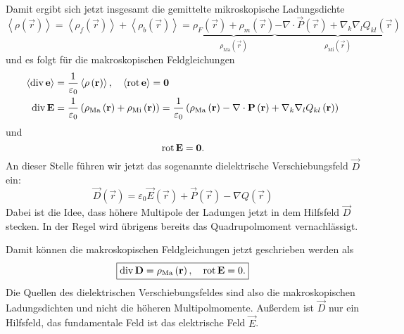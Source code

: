 Damit ergibt sich jetzt insgesamt die gemittelte mikroskopische Ladungsdichte
\begin{equation*}
	\left\langle \rho \left(\vec {r}\right)\right\rangle =\left\langle \rho _{f}\left(\vec {r}\right)\right\rangle +\left\langle \rho _{b}\left(\vec {r}\right)\right\rangle =\underset{\rho _{\mathrm{Ma}}\left(\vec {r}\right)}{\underbrace{\rho _{F}\left(\vec {r}\right)+\rho _{m}\left(\vec {r}\right)}}\underset{\rho _{\mathrm{Mi}}\left(\vec {r}\right)}{\underbrace{-\nabla \cdot \vec {P}\left(\vec {r}\right)+\nabla _{k}\nabla _{l}Q_{kl}\left(\vec {r}\right)}}
\end{equation*}
und es folgt für die makroskopischen Feldgleichungen
\begin{align*}
	\left\langle \operatorname{div} \mathbf{e}\right\rangle & =\frac{1}{\varepsilon _{0}}\left\langle \rho \left(\mathbf{r}\right)\right\rangle ,\quad \left\langle \operatorname{rot} \mathbf{e}\right\rangle =\mathbf{0}    \\
	\operatorname{div} \mathbf{E}                           & =\frac{1}{\varepsilon _{0}}\left(\rho _{\mathrm{Ma}}\left(\mathbf{r}\right)+\rho _{\mathrm{Mi}}\left(\mathbf{r}\right)\right)=\frac{1}{\varepsilon _{0}}\left(\rho _{\mathrm{Ma}}\left(\mathbf{r}\right)-\nabla \cdot \mathbf{P}\left(\mathbf{r}\right)+\nabla _{k}\nabla _{l}Q_{kl}\left(\mathbf{r}\right)\right)
\end{align*}
und
\begin{equation*}
	\operatorname{rot} \mathbf{E}=\mathbf{0}.
\end{equation*}
An dieser Stelle führen wir jetzt das sogenannte dielektrische Verschiebungsfeld $\vec {D}$ ein:
\begin{equation*}
	\vec {D}\left(\vec {r}\right)=\varepsilon _{0}\vec {E}\left(\vec {r}\right)+\vec {P}\left(\vec {r}\right)-\nabla Q\left(\vec {r}\right)
\end{equation*}
Dabei ist die Idee, dass höhere Multipole der Ladungen jetzt in dem Hilfsfeld $\vec {D}$ stecken. In der Regel wird übrigens bereits das Quadrupolmoment vernachlässigt.

Damit können die makroskopischen Feldgleichungen jetzt geschrieben werden als
\begin{equation*}
	\boxed{\operatorname{div} \mathbf{D}=\rho _{\mathrm{Ma}}\left(\mathbf{r}\right), \quad\operatorname{rot} \mathbf{E}=0.}
\end{equation*}
Die Quellen des dielektrischen Verschiebungsfeldes sind also die makroskopischen Ladungsdichten und nicht die höheren Multipolmomente. Außerdem ist $\vec {D}$ nur ein Hilfsfeld, das fundamentale Feld ist das elektrische Feld $\vec {E}$.

